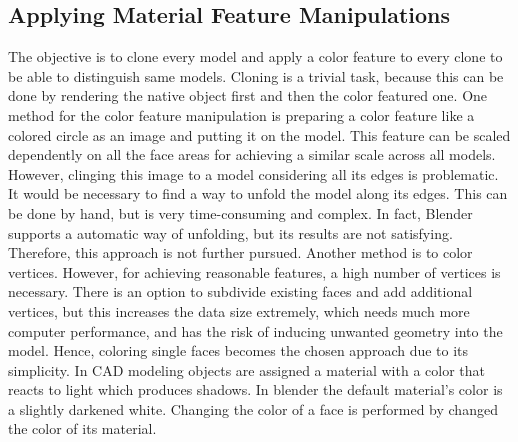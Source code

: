 \subsection{Applying Material Feature Manipulations}
\label{sec:dataset-material-feature}
The objective is to clone every model and apply a color feature to every clone to be able to distinguish same models.
Cloning is a trivial task, because this can be done by rendering the native object first and then the color featured one.
One method for the color feature manipulation is preparing a color feature like a colored circle as an image and putting it on the model.
This feature can be scaled dependently on all the face areas for achieving a similar scale across all models.
However, clinging this image to a model considering all its edges is problematic.
It would be necessary to find a way to unfold the model along its edges.
This can be done by hand, but is very time-consuming and complex.
In fact, Blender supports a automatic way of unfolding, but its results are not satisfying.
Therefore, this approach is not further pursued.
Another method is to color vertices.
However, for achieving reasonable features, a high number of vertices is necessary.
There is an option to subdivide existing faces and add additional vertices, but this increases the data size extremely, which needs much more computer performance, and has the risk of inducing unwanted geometry into the model.
Hence, coloring single faces becomes the chosen approach due to its simplicity.
In CAD modeling objects are assigned a material with a color that reacts to light which produces shadows.
In blender the default material's color is a slightly darkened white.
Changing the color of a face is performed by changed the color of its material.


